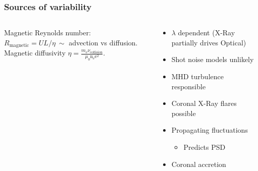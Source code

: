 \documentclass[hyperref={pdfpagelabels=false}]{beamer}
\begin{document}
\begin{frame}
\begin{columns}
\begin{column}{0.5\textwidth}
      \begin{center}
        {\tiny \citet{HawleyKrolik02}}
      \end{center}
    \end{column}
  \end{columns}
\end{frame}

\begin{frame}
\frametitle{Sources of variability}
  \begin{columns}
    \begin{column}{0.5\textwidth}
      \begin{center}
        \centering
      \end{center}
      \begin{center}
        \centering
        {\tiny \citet{ArmitageReynolds03}}
      \end{center}
      Magnetic Reynolds number: $R_{\mathrm{magnetic}} = UL/\eta \ \sim$ advection vs diffusion. \\
      Magnetic diffusivity $\eta = \frac{m_{\mathrm{e}}\nu_{\mathrm{collision}}}{\mu_{0}\mathrm{n}_{\mathrm{e}}\mathrm{e}^{2}}$.
    \end{column}
    \begin{column}{0.5\textwidth}
      \begin{itemize}
        \item $\lambda$ dependent (X-Ray partially drives Optical) {\tiny \citep{UttleyAccretion}}
        \item Shot noise models unlikely {\tiny \citep{UMV05}}
        \item MHD turbulence responsible {\tiny \citep{NowakWagoner95}}
        \item Coronal X-Ray flares possible {\tiny \citep{PoutanenFabian99}}
        \item Propagating fluctuations {\tiny \citep{Lyubarskii97}}
          \begin{itemize}
            \item Predicts PSD
          \end{itemize}
        \item Coronal accretion {\tiny \citep{JaniukCzerny07}}
      \end{itemize}
    \end{column}
  \end{columns}
\end{frame}
\end{document}
